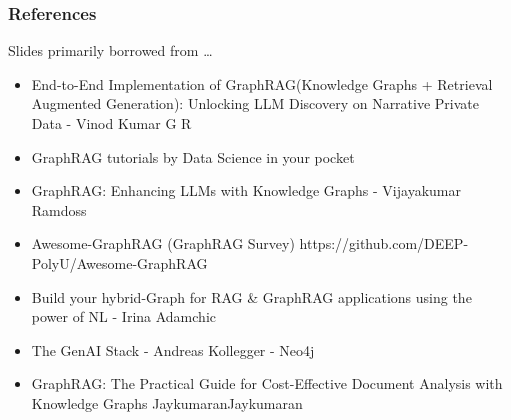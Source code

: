 \begin{frame}[fragile]\frametitle{References}
Slides primarily borrowed from \ldots

\begin{itemize}
\item End-to-End Implementation of GraphRAG(Knowledge Graphs + Retrieval Augmented Generation): Unlocking LLM Discovery on Narrative Private Data - Vinod Kumar G R
\item GraphRAG tutorials by Data Science in your pocket
\item GraphRAG: Enhancing LLMs with Knowledge Graphs - Vijayakumar Ramdoss
\item Awesome-GraphRAG (GraphRAG Survey) https://github.com/DEEP-PolyU/Awesome-GraphRAG
\item Build your hybrid-Graph for RAG \& GraphRAG applications using the power of NL - Irina Adamchic
\item The GenAI Stack - Andreas Kollegger - Neo4j
\item GraphRAG: The Practical Guide for Cost-Effective Document Analysis with Knowledge Graphs
JaykumaranJaykumaran
\end{itemize}

\end{frame}
